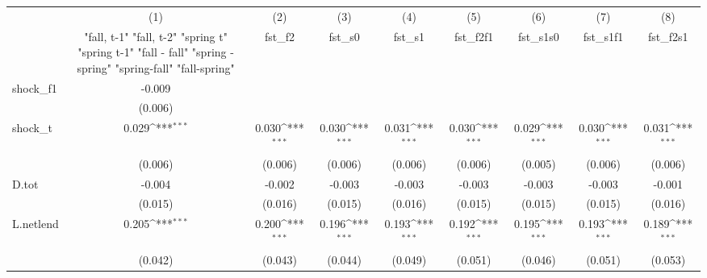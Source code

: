 {
\def\sym#1{\ifmmode^{#1}\else\(^{#1}\)\fi}
\begin{tabular}{l*{8}{c}}
\toprule
            &\multicolumn{1}{c}{(1)}&\multicolumn{1}{c}{(2)}&\multicolumn{1}{c}{(3)}&\multicolumn{1}{c}{(4)}&\multicolumn{1}{c}{(5)}&\multicolumn{1}{c}{(6)}&\multicolumn{1}{c}{(7)}&\multicolumn{1}{c}{(8)}\\
            &\multicolumn{1}{c}{  "fall, t-1" "fall, t-2" "spring t" "spring t-1"  "fall - fall" "spring - spring" "spring-fall" "fall-spring" }&\multicolumn{1}{c}{fst\_f2}&\multicolumn{1}{c}{fst\_s0}&\multicolumn{1}{c}{fst\_s1}&\multicolumn{1}{c}{fst\_f2f1}&\multicolumn{1}{c}{fst\_s1s0}&\multicolumn{1}{c}{fst\_s1f1}&\multicolumn{1}{c}{fst\_f2s1}\\
\midrule
shock\_f1    &      -0.009         &                     &                     &                     &                     &                     &                     &                     \\
            &     (0.006)         &                     &                     &                     &                     &                     &                     &                     \\
\addlinespace
shock\_t     &       0.029\sym{***}&       0.030\sym{***}&       0.030\sym{***}&       0.031\sym{***}&       0.030\sym{***}&       0.029\sym{***}&       0.030\sym{***}&       0.031\sym{***}\\
            &     (0.006)         &     (0.006)         &     (0.006)         &     (0.006)         &     (0.006)         &     (0.005)         &     (0.006)         &     (0.006)         \\
\addlinespace
D.tot       &      -0.004         &      -0.002         &      -0.003         &      -0.003         &      -0.003         &      -0.003         &      -0.003         &      -0.001         \\
            &     (0.015)         &     (0.016)         &     (0.015)         &     (0.016)         &     (0.015)         &     (0.015)         &     (0.015)         &     (0.016)         \\
\addlinespace
L.netlend   &       0.205\sym{***}&       0.200\sym{***}&       0.196\sym{***}&       0.193\sym{***}&       0.192\sym{***}&       0.195\sym{***}&       0.193\sym{***}&       0.189\sym{***}\\
            &     (0.042)         &     (0.043)         &     (0.044)         &     (0.049)         &     (0.051)         &     (0.046)         &     (0.051)         &     (0.053)         \\

\end{tabular}}
